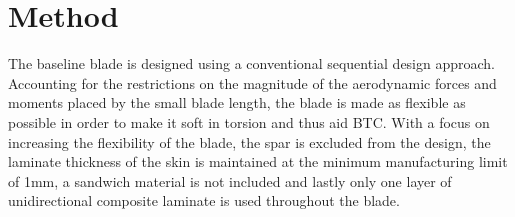\documentclass[a4paper]{jpconf}
\begin{document}


\section{Method}
\label{sec:method}
The baseline blade is designed using a conventional sequential design approach. Accounting for the restrictions on the magnitude of the aerodynamic forces and moments placed by the small blade length, the blade is made as flexible as possible in order to make it soft in torsion and thus aid BTC. With a focus on increasing the flexibility of the blade, the spar is excluded from the design, the laminate thickness of the skin is maintained at the minimum manufacturing limit of 1mm, a sandwich material is not included and lastly only one layer of unidirectional composite laminate is used throughout the blade. 
\end{document}
